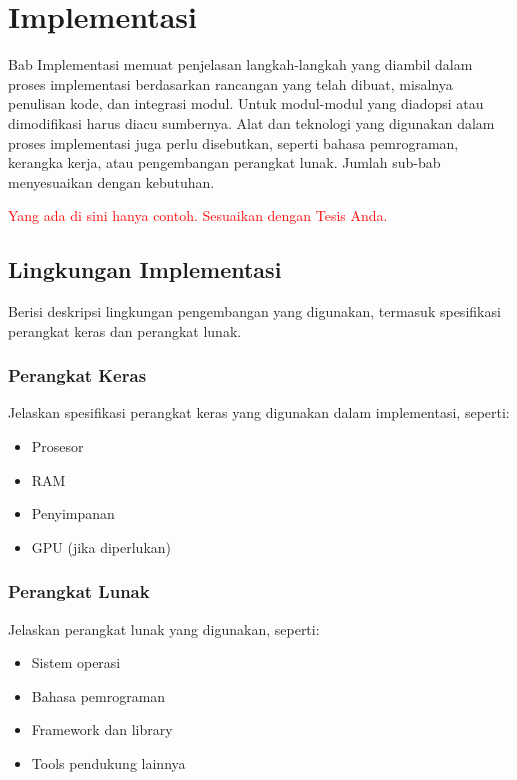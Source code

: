 \chapter{Implementasi}

Bab Implementasi memuat penjelasan langkah-langkah yang diambil dalam proses implementasi berdasarkan rancangan yang telah dibuat, misalnya penulisan kode, dan integrasi modul. Untuk modul-modul yang diadopsi atau dimodifikasi harus diacu sumbernya. Alat dan teknologi yang digunakan dalam proses implementasi juga perlu disebutkan, seperti bahasa pemrograman, kerangka kerja, atau pengembangan perangkat lunak. Jumlah sub-bab menyesuaikan dengan kebutuhan.

\textcolor{red}{Yang ada di sini hanya contoh. Sesuaikan dengan Tesis Anda.}

\section{Lingkungan Implementasi}

Berisi deskripsi lingkungan pengembangan yang digunakan, termasuk spesifikasi perangkat keras dan perangkat lunak.

\subsection{Perangkat Keras}

Jelaskan spesifikasi perangkat keras yang digunakan dalam implementasi, seperti:
\begin{itemize}
    \item Prosesor
    \item RAM
    \item Penyimpanan
    \item GPU (jika diperlukan)
\end{itemize}

\subsection{Perangkat Lunak}

Jelaskan perangkat lunak yang digunakan, seperti:
\begin{itemize}
    \item Sistem operasi
    \item Bahasa pemrograman
    \item Framework dan library
    \item Tools pendukung lainnya
\end{itemize}

